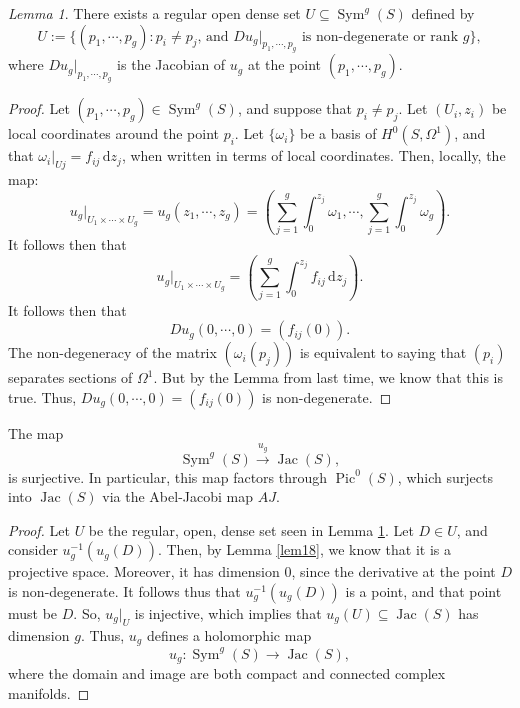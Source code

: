 \documentclass[a4paper]{report}
\theoremstyle{definition}
\theoremstyle{remark}
\theoremstyle{proposition}
\theoremstyle{conjecture}
\theoremstyle{lemma}
\newtheorem{lemma}{Lemma}
\theoremstyle{corollary}
\theoremstyle{exercise}
\theoremstyle{example}
\newcommand{\diff}{\,\mathrm{d}}
\newcommand{\on}{\operatorname}
\begin{document}
\begin{lemma}\label{lem19}
    There exists a regular open dense set $U \subseteq \on{Sym}^g(S)$
    defined by 
    $$U := \lbrace (p_1,\cdots,p_g) : \text{$p_i \neq p_j$, and $Du_g\vert_{p_1,\cdots,p_g}$ is non-degenerate or rank $g$} \rbrace,$$
    where $Du_g\vert_{p_1,\cdots,p_g}$ is the Jacobian of $u_g$ 
    at the point $(p_1,\cdots,p_g)$.
\end{lemma}

\begin{proof}
    Let $(p_1,\cdots,p_g) \in \on{Sym}^g(S)$, and suppose that 
    $p_i\neq p_j$. Let $(U_i,z_i)$ be local coordinates around the point 
    $p_i$. Let $\lbrace \omega_i\rbrace$ be a basis of 
    $H^0(S,\Omega^1)$, and that $\omega_i\vert_{Uj} = f_{ij}\diff z_j$, when
    written in terms of local coordinates.
    Then, locally, the map:
    $$u_g\vert_{U_1\times\cdots\times U_g} = u_g(z_1,\cdots,z_g) =\left( \sum_{j=1}^g\int_0^{z_j}\omega_1,\cdots, \sum_{j=1}^g \int_0^{z_j}\omega_g\right).$$
    It follows then that 
    $$u_g\vert_{U_1\times \cdots \times U_g} = \left(\sum_{j=1}^g\int_0^{z_j}f_{ij}\diff z_j\right).$$
    It follows then that 
    $$Du_g(0,\cdots,0) = ( f_{ij}(0)).$$ 
    The non-degeneracy of the matrix $(\omega_i(p_j))$ is equivalent to 
    saying that $(p_i)$ separates sections of $\Omega^1$. But by the Lemma
    from last time, we know that this is true. Thus, 
    $Du_g(0,\cdots,0) = (f_{ij}(0))$ is non-degenerate. 
\end{proof}

\begin{theorem}
    The map $$\on{Sym}^g(S) \stackrel{u_g}{\longrightarrow} \on{Jac}(S),$$
    is surjective. In particular, this map factors through 
    $\on{Pic}^0(S)$, which surjects into $\on{Jac}(S)$ via the 
    Abel-Jacobi map $AJ$.
\end{theorem}

\begin{proof}
    Let $U$ be the regular, open, dense set seen in Lemma \ref{lem19}.
    Let $D \in U$, and consider $u_g^{-1}(u_g(D))$. Then, by Lemma 
    \ref{lem18}, we know that it is a projective space. Moreover, 
    it has dimension $0$, since the derivative at the point $D$ 
    is non-degenerate. It follows thus that $u_g^{-1}(u_g(D))$ is a
    point, and that point must be $D$. So, $u_g\vert_{U}$ is injective,
    which implies that $u_g(U) \subseteq \on{Jac}(S)$ has dimension $g$.
    Thus, $u_g$ defines a holomorphic map
    $$u_g : \on{Sym}^g(S) \longrightarrow \on{Jac}(S),$$
    where the domain and image are both compact and connected complex 
    manifolds.
\end{proof}
\end{document}
